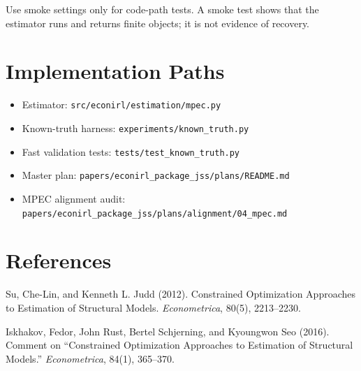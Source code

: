 \documentclass[10pt]{article}
\begin{document}
Use smoke settings only for code-path tests. A smoke test shows that the
estimator runs and returns finite objects; it is not evidence of recovery.

\section{Implementation Paths}

\begin{itemize}
\item Estimator: \texttt{src/econirl/estimation/mpec.py}
\item Known-truth harness: \texttt{experiments/known\_truth.py}
\item Fast validation tests: \texttt{tests/test\_known\_truth.py}
\item Master plan: \texttt{papers/econirl\_package\_jss/plans/README.md}
\item MPEC alignment audit: \texttt{papers/econirl\_package\_jss/plans/alignment/04\_mpec.md}
\end{itemize}

\section{References}

Su, Che-Lin, and Kenneth L. Judd (2012). Constrained Optimization Approaches
to Estimation of Structural Models. \emph{Econometrica}, 80(5), 2213--2230.

Iskhakov, Fedor, John Rust, Bertel Schjerning, and Kyoungwon Seo (2016).
Comment on ``Constrained Optimization Approaches to Estimation of Structural
Models.'' \emph{Econometrica}, 84(1), 365--370.
\end{document}
